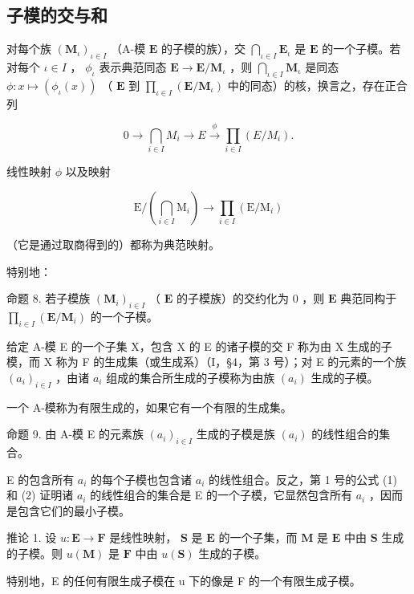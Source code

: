 \subsection{子模的交与和}

对每个族 \((\mathbf{M}_{\iota})_{\iota \in I}\) （A-模 \(\mathbf{E}\) 的子模的族），交 \(\bigcap_{\iota \in I} \mathbf{E}_{\iota}\) 是 \(\mathbf{E}\) 的一个子模。若对每个 \(\iota \in I\) ， \(\phi_{\iota}\) 表示典范同态 \(\mathbf{E} \to \mathbf{E} / \mathbf{M}_{\iota}\) ，则 \(\bigcap_{\iota \in I} \mathbf{M}_{\iota}\) 是同态 \(\phi: x \mapsto (\phi_{\iota}(x))\) （ \(\mathbf{E}\) 到 \(\prod_{\iota \in I} (\mathbf{E} / \mathbf{M}_{\iota})\) 中的同态）的核，换言之，存在正合列

\[
0 \longrightarrow \bigcap_ {i \in I} M _ {i} \longrightarrow E \stackrel {\phi} {\longrightarrow} \prod_ {i \in I} (E / M _ {i}).\tag{27}
\]

线性映射 \(\phi\) 以及映射

\[
\mathrm{E} / \left(\bigcap_ {i \in I} \mathrm{M} _ {i}\right)\rightarrow \prod_ {i \in I} (\mathrm{E} / \mathrm{M} _ {i})
\]

（它是通过取商得到的）都称为典范映射。

特别地：

命题 8. 若子模族 \((\mathbf{M}_i)_{i\in I}\) （ \(\mathbf{E}\) 的子模族）的交约化为 0 ，则 \(\mathbf{E}\) 典范同构于 \(\prod_{i\in I}(\mathbf{E}/\mathbf{M}_i)\) 的一个子模。

给定 A-模 E 的一个子集 X，包含 X 的 E 的诸子模的交 F 称为由 X 生成的子模，而 X 称为 F 的生成集（或生成系）（I，§4，第 3 号）；对 E 的元素的一个族 \((a_{i})_{i\in I}\) ，由诸 \(a_{i}\) 组成的集合所生成的子模称为由族 \((a_{i})\) 生成的子模。

一个 A-模称为有限生成的，如果它有一个有限的生成集。

命题 9. 由 A-模 E 的元素族 \((a_{i})_{i\in I}\) 生成的子模是族 \((a_{i})\) 的线性组合的集合。

E 的包含所有 \(a_{i}\) 的每个子模也包含诸 \(a_{i}\) 的线性组合。反之，第 1 号的公式 (1) 和 (2) 证明诸 \(a_{i}\) 的线性组合的集合是 E 的一个子模，它显然包含所有 \(a_{i}\) ，因而是包含它们的最小子模。

推论 1. 设 \(u: \mathbf{E} \to \mathbf{F}\) 是线性映射， \(\mathbf{S}\) 是 \(\mathbf{E}\) 的一个子集，而 \(\mathbf{M}\) 是 \(\mathbf{E}\) 中由 \(\mathbf{S}\) 生成的子模。则 \(u(\mathbf{M})\) 是 \(\mathbf{F}\) 中由 \(u(\mathbf{S})\) 生成的子模。

特别地，E 的任何有限生成子模在 u 下的像是 F 的一个有限生成子模。

